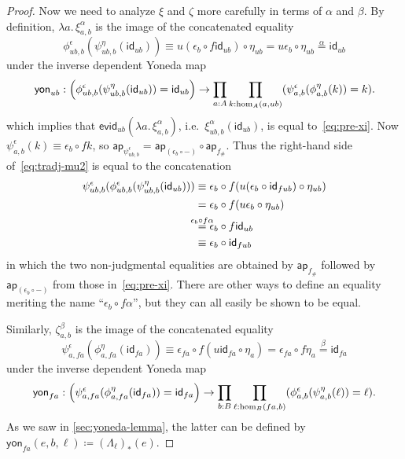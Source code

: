 \documentclass[12pt]{amsart}
\theoremstyle{plain}
\theoremstyle{definition}
\theoremstyle{remark}
\numberwithin{equation}{section}
\newcommand{\extfn}[1]{{#1}_\#}
\newcommand{\jdeq}{\equiv}
\newcommand{\defeq}{\coloneqq}
\newcommand{\evid}{\mathsf{evid}}
\newcommand{\yon}{\mathsf{yon}}
\newcommand{\connmin}[1]{\mathsf{\Lambda}_{#1}}
\newcommand{\lam}[1]{\lambda #1.\,}
\newcommand{\idarr}[1]{\mathsf{id}_{#1}}
\newcommand{\ap}{\mathsf{ap}}                             %
\newcommand{\covtr}[1]{{#1}_*}  %
\newcommand{\Parens}[1]{\Bigl(#1\Bigr)}
\begin{document}
\begin{proof}
  Now we need to analyze $\xi$ and $\zeta$ more carefully in terms of $\alpha$ and $\beta$.
  By definition, $\lam{a}\xi^\alpha_{a,b}$ is the image of the concatenated equality
  \begin{equation}
  \phi^\epsilon_{ub,b}(\psi^\eta_{ub,b}(\idarr{ub})) \jdeq 
  u(\epsilon_b \circ f\idarr{ub}) \circ \eta_{ub}
  = u\epsilon_b \circ \eta_{ub} \overset\alpha= \idarr{ub}\label{eq:pre-xi}
  \end{equation}
  under the inverse dependent Yoneda map
  \[ \yon_{ub} :
  \Parens{\phi^\epsilon_{ub,b}(\psi^\eta_{ub,b}(\idarr{ub})) = \idarr{ub}}
  \to  \prod_{a:A} \prod_{k:\hom_A(a,ub)} (\psi^\epsilon_{a,b}(\phi^\eta_{a,b}(k)) = k).
  \]
  which implies that $\evid_{ub}(\lam{a}\xi^\alpha_{a,b})$, i.e.\ $\xi^\alpha_{ub,b}(\idarr{ub})$, is equal to~\eqref{eq:pre-xi}.
  Now $\psi^\epsilon_{a,b}(k) \jdeq \epsilon_b \circ fk$, so $\ap_{\psi^\epsilon_{ub,b}} = \ap_{(\epsilon_b\circ -)} \circ \ap_{\extfn f}$.
  Thus the right-hand side of~\eqref{eq:tradj-mu2} is equal to the concatenation
  \begin{align}
    \psi^\epsilon_{ub,b}(\phi^\epsilon_{ub,b}(\psi^\eta_{ub,b}(\idarr{ub})))
    &\jdeq \epsilon_b \circ f(u(\epsilon_b \circ \idarr{fub}) \circ \eta_{ub}) \notag\\
    &= \epsilon_b \circ f(u\epsilon_b \circ \eta_{ub}) \notag\\
    &\overset{\mathclap{\epsilon_b \circ f\alpha}}= \epsilon_b \circ f\idarr{ub} \label{eq:ep-f-alpha}\\
    &\jdeq \epsilon_b \circ \idarr{fub}\notag
  \end{align}
  in which the two non-judgmental equalities are obtained by $\ap_{\extfn f}$ followed by $\ap_{(\epsilon_b\circ -)}$ from those in~\eqref{eq:pre-xi}.
  There are other ways to define an equality meriting the name ``${\epsilon_b \circ f\alpha}$'', but they can all easily be shown to be equal.

  Similarly, $\zeta^\beta_{a,b}$ is the image of the concatenated equality
  \begin{equation}\label{eq:pre-zeta}
    \psi^\epsilon_{a,fa}(\phi^\eta_{a,fa}(\idarr{fa}))
    \jdeq \epsilon_{fa} \circ f(u\idarr{fa} \circ \eta_a)
    = \epsilon_{fa} \circ f\eta_a
    \overset{\beta}= \idarr{fa}
  \end{equation}
  under the inverse dependent Yoneda map
  \begin{equation*}
    \yon_{fa} : \Parens{\psi^\epsilon_{a,fa}(\phi^\eta_{a,fa}(\idarr{fa})) = \idarr{fa}}
    \to \prod_{b:B} \prod_{\ell:\hom_B(fa,b)} (\phi^\epsilon_{a,b}(\psi^\eta_{a,b}(\ell)) = \ell).
  \end{equation*}
  As we saw in \cref{sec:yoneda-lemma}, the latter can be defined by $\yon_{fa}(e,b,\ell) \defeq \covtr{(\connmin \ell)}(e)$.


\end{proof}
\end{document}
